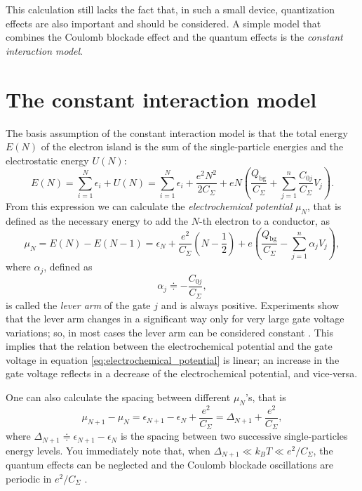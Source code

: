 This calculation still lacks the fact that, in such a small device, quantization effects are also important and should be considered. A simple model that combines the Coulomb blockade effect and the quantum effects is the \emph{constant interaction model}.

\section{The constant interaction model}
The basis assumption of the constant interaction model is that the total energy $E(N)$ of the electron island is the sum of the single-particle energies and the electrostatic energy $U(N)$:
\begin{equation}
	E(N) = \sum_{i=1}^{N}\epsilon_i + U(N) = \sum_{i=1}^{N}\epsilon_i + \frac{e^2N^2}{2C_{\Sigma}} + eN\left( \frac{Q_{\text{bg}}}{C_{\Sigma}} + \sum_{j=1}^{n}\frac{C_{0j}}{C_{\Sigma}}V_j \right).
\end{equation}
From this expression we can calculate the \emph{electrochemical potential} $\mu_N$, that is defined as the necessary energy to add the $N$-th electron to a conductor, as
\begin{equation}
	\mu_N 
	= E(N) - E(N-1) 
	=  \epsilon_N + \frac{e^2}{C_{\Sigma}}\left(N-\frac{1}{2}\right) + e\left( \frac{Q_{\text{bg}}}{C_{\Sigma}} - \sum_{j=1}^{n}\alpha_jV_j \right),
	\label{eq:electrochemical_potential}
\end{equation}
where $\alpha_j$, defined as
\begin{equation}
	\alpha_j \doteqdot - \frac{C_{0j}}{C_{\Sigma}},
\end{equation}
is called the \emph{lever arm} of the gate $j$ and is always positive. Experiments show that the lever arm changes in a significant way only for very large gate voltage variations; so, in most cases the lever arm can be considered constant \citep{Fasth2007}. This implies that the relation between the electrochemical potential and the gate voltage in equation \eqref{eq:electrochemical_potential} is linear; an increase in the gate voltage reflects in a decrease of the electrochemical potential, and vice-versa.

One can also calculate the spacing between different $\mu_N$'s, that is
\begin{equation}
	\mu_{N+1}-\mu_N 
	= \epsilon_{N+1} - \epsilon_{N} + \frac{e^2}{C_{\Sigma}}
	= \Delta_{N+1} + \frac{e^2}{C_{\Sigma}},
\end{equation}
where $\Delta_{N+1}\doteqdot \epsilon_{N+1} - \epsilon_{N}$ is the spacing between two successive single-particles energy levels. You immediately note that, when $\Delta_{N+1} \ll k_BT \ll e^2/C_{\Sigma}$, the quantum effects can be neglected and the Coulomb blockade oscillations are periodic in $e^2/C_{\Sigma}$ \citep{Reimann2002}.

